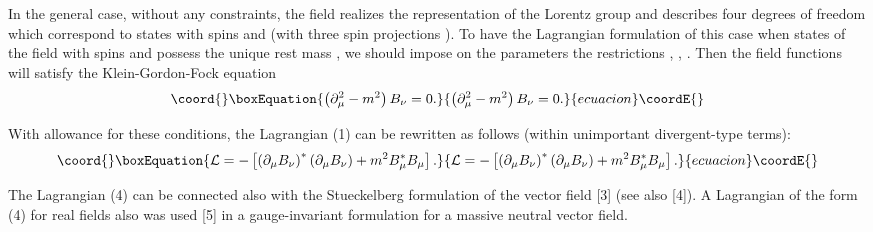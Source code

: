 \documentclass[a4paper,12pt]{article}
\begin{document}
In the general case, without any constraints, the field \coordHE{}
realizes the \coordHE{}
representation of the Lorentz group and describes four degrees of
freedom which correspond to states with spins \coordHE{} and \coordHE{}
(with three spin projections \coordHE{}  \coordHE{} ). To have the
Lagrangian formulation of this case when states of the field
\coordHE{} with spins \coordHE{} and \coordHE{} possess the unique rest mass
\coordHE{}, we should impose on the parameters the restrictions \coordHE{},
\coordHE{}, \coordHE{}. Then the field functions \coordHE{} will
satisfy the Klein-Gordon-Fock equation
\begin{equation}\coord{}\boxEquation{
\left( \partial _\mu ^2-m^2\right) B_\nu =0.  \label{3}
}{
\left( \partial _\mu ^2-m^2\right) B_\nu =0.  }{ecuacion}\coordE{}\end{equation}

With allowance for these conditions, the Lagrangian (1) can be
rewritten as follows (within unimportant divergent-type terms):
\begin{equation}\coord{}\boxEquation{
\mathcal{L}=-\left[ \left( \partial _\mu B_\nu \right) ^{*}\left(
\partial _\mu B_\nu \right) +m^2B_\mu ^{*}B_\mu \right].  \label{4}
}{
\mathcal{L}=-\left[ \left( \partial _\mu B_\nu \right) ^{*}\left(
\partial _\mu B_\nu \right) +m^2B_\mu ^{*}B_\mu \right].  }{ecuacion}\coordE{}\end{equation}

The Lagrangian (4) can be connected also with the Stueckelberg
formulation of the vector field [3] (see also [4]). A Lagrangian
of the form (4) for real fields \coordHE{} also was used [5] in a
gauge-invariant formulation for a massive neutral vector field.
\end{document}
